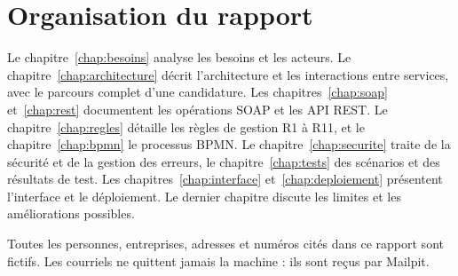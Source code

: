 \section{Organisation du rapport}

Le chapitre~\ref{chap:besoins} analyse les besoins et les acteurs. Le chapitre~\ref{chap:architecture} décrit l'architecture et les interactions entre services, avec le parcours complet d'une candidature. Les chapitres~\ref{chap:soap} et~\ref{chap:rest} documentent les opérations SOAP et les API REST. Le chapitre~\ref{chap:regles} détaille les règles de gestion R1 à R11, et le chapitre~\ref{chap:bpmn} le processus BPMN. Le chapitre~\ref{chap:securite} traite de la sécurité et de la gestion des erreurs, le chapitre~\ref{chap:tests} des scénarios et des résultats de test. Les chapitres~\ref{chap:interface} et~\ref{chap:deploiement} présentent l'interface et le déploiement. Le dernier chapitre discute les limites et les améliorations possibles.

\begin{encadre}
Toutes les personnes, entreprises, adresses et numéros cités dans ce rapport sont fictifs. Les courriels ne quittent jamais la machine : ils sont reçus par Mailpit.
\end{encadre}
